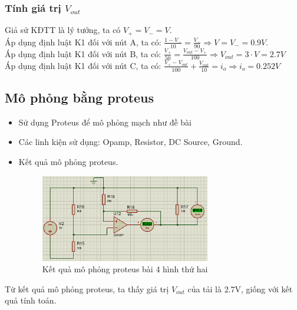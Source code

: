         \subsubsection{Tính giá trị $V_{out}$}
            \hspace*{0.6cm}Giả sử KĐTT là lý tưởng, ta có $V_{+} = V_{-} = V$. \\
            \hspace*{0.6cm}Áp dụng định luật K1 đối với nút A, ta có: $\frac{1 - V_{-}}{10} = \frac{V_{-}}{90} \Rightarrow V = V_{-} = 0.9V$. \\
            \hspace*{0.6cm}Áp dụng định luật K1 đối với nút B, ta có: $\frac{V_{+}}{50} = \frac{V_{out} - V_{+}}{100} \Rightarrow V_{out} = 3\cdot V= 2.7V$ \\
            \hspace*{0.6cm}Áp dụng định luật K1 đối với nút C, ta có: $\frac{V_{+} - V_{out}}{100} + \frac{V_{out}}{10} = i_{o} \Rightarrow i_{o} = 0.252V$ \\
        \subsection{Mô phỏng bằng proteus}
            \begin{itemize}
                \item Sử dụng Proteus để mô phỏng mạch như đề bài
                \item Các linh kiện sử dụng: Opamp, Resistor, DC Source, Ground.
                \item Kết quả mô phỏng proteus.
                \begin{figure}[H]
                    \centering
                    \includegraphics[width=0.7\textwidth]{pictures/result4_b.png}
                    \caption{Kết quả mô phỏng proteus bài 4 hình thứ hai}
                \end{figure}
            \end{itemize}
            \hspace*{0.6cm}Từ kết quả mô phỏng proteus, ta thấy giá trị $V_{out}$ của tải là 2.7V, giống với kết quả tính toán.

